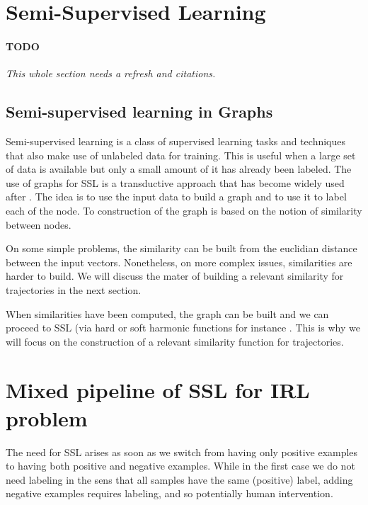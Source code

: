 \documentclass{article}
\begin{document}
\section{Semi-Supervised Learning \label{sec:ssl}}

\paragraph{TODO} \emph{This whole section needs a refresh and citations.}

\subsection{Semi-supervised learning in Graphs}

Semi-supervised learning is a class of supervised learning tasks and techniques that also make use of unlabeled data for training. This is useful when a large set of data is available but only a small amount of it has already been labeled.
The use of graphs for SSL is a transductive approach \cite{chapelle09} that has become widely used after \cite{Zhu03}.
The idea is to use the input data to build a graph and to use it to label each of the node. To construction of the graph is based on the notion of similarity between nodes. 

On some simple problems, the similarity can be built from the euclidian distance between the input vectors. Nonetheless, on more complex issues, similarities are harder to build. We will discuss the mater of building a relevant similarity for trajectories in the next section.

When similarities have been computed, the graph can be built and we can proceed to SSL (via hard or soft harmonic functions for instance \cite{doyle84}. This is why we will focus on the construction of a relevant similarity function for trajectories.

\section{Mixed pipeline of SSL for IRL problem \label{sec:combine}}

The need for SSL arises as soon as we switch from having only positive examples to having both positive and negative examples. While in the first case we do not need labeling in the sens that all samples have the same (positive) label, adding negative examples requires labeling, and so potentially human intervention.
\end{document}
